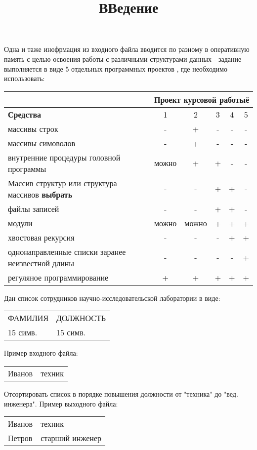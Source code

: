 \title{ВВедение}

Одна и таже инофрмация из входного файла вводится по разному в оперативную память с целью освоения работы с различными структурами данных - задание выполняется в виде 5 отдельных программных проектов , где необходимо использовать:

\begin{tabular}{|l|c|c|c|c|c|}
   \hline
   \multicolumn{1}{|c|}{} & \multicolumn{5}{c|}{\textbf{Проект курсовой работыё}}\\
   \hline
   \textbf{Средства} & 1 & 2 & 3 & 4 & 5\\
   \hline
   массивы строк & - & + & - & - & -\\
   \hline
   массивы симоволов & - & + & - & - & -\\
   \hline
   внутренние процедуры головной программы & можно & + & + & - & -\\
   \hline
   Массив структур или структура массивов \textbf{выбрать} & - & - & + & + & -\\
   \hline
   файлы записей & - & - & + & + & -\\
   \hline
   модули & можно & можно & + & + & +\\
   \hline
   хвостовая рекурсия & - & - & - & + & +\\
   \hline
   однонаправленные списки заранее неизвестной длины & - & - & - & - & +\\
   \hline 
   регуляное программирование & + & + & + & + & +\\
   \hline
\end{tabular}


Дан список сотрудников научно-исследовательской лаборатории в виде:


\begin{tabular}{ll}
   ФАМИЛИЯ & ДОЛЖНОСТЬ\\ 15 симв. & 15 симв.\\
\end{tabular}

Пример входного файла:

\begin{tabular}{ll}
   Иванов & техник
\end{tabular}

Отсортировать список в порядке повышения должности от "техника" до "вед. инженера". Пример выходного файла:

\begin{tabular}{ll}
   Иванов & техник \\ Петров & старший инженер
\end{tabular}


